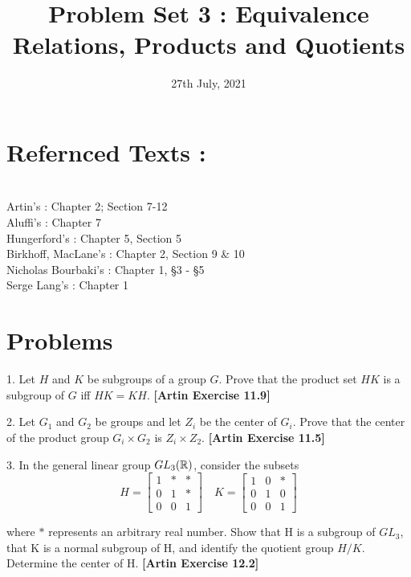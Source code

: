 \documentclass{article}
\title{Problem Set 3 : Equivalence Relations, Products and Quotients}
\date{27th July, 2021}
\newcommand{\tb}[1]{\textbf{#1}}
\begin{document}
\maketitle

\section{Refernced Texts :} \\
Artin's  : Chapter 2; Section 7-12 \\
Aluffi's  : Chapter 7 \\
Hungerford's : Chapter 5, Section 5 \\
Birkhoff, MacLane's : Chapter 2, Section 9 \& 10 \\
Nicholas Bourbaki's  : Chapter 1, \S 3 - \S 5 \\
Serge Lang's  : Chapter 1 

\section{Problems}

1. Let $H$ and $K$ be subgroups of a group $G$. Prove that the product set $HK$ is a subgroup of $G$ iff $HK=KH$. \tb{[Artin Exercise 11.9]}

\vspace{3mm}
\noindent

2. Let $G_{1}$ and $G_{2}$ be groups and let $Z_{i}$ be the center of $G_{i}$. Prove that the center of the product group $G_{i} \times G_{2}$ is $Z_{i} \times Z_{2}$.  \tb{[Artin Exercise 11.5]}

\vspace{3mm}
\noindent

3. In the general linear group $GL_{3}(\mathbb{R})$, consider the subsets 
\[ H = \begin{bmatrix} 1 & \ast & \ast \\ 0 & 1 & \ast \\ 0 & 0 & 1 \end{bmatrix} \quad K = \begin{bmatrix} 1 & 0 & \ast \\  0 & 1 & 0 \\ 0 & 0 & 1 \end{bmatrix} \] 

where $\ast$ represents an arbitrary real number. Show that H is a subgroup of $GL_{3}$, that K is a normal subgroup of H, and identify the quotient group $H/K$. Determine the center of H. \tb{[Artin Exercise 12.2]}
\end{document}
